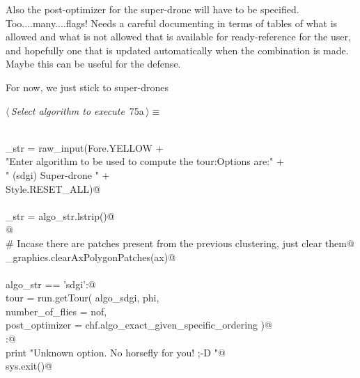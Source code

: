 \documentclass[11.5pt]{report}
\begin{document}
Also the post-optimizer for the super-drone will have to be specified. Too....many....flags! 
Needs a careful documenting in terms of tables of what is allowed and what is not allowed
that is available for ready-reference for the user, and hopefully one that is updated
automatically when the combination is made. Maybe this can be useful for the defense.  

For now, we just stick to super-drones

\begin{flushleft} \small
\begin{minipage}{\linewidth}\label{scrap105}\raggedright\small
{} $\langle\,${\itshape Select algorithm to execute}\nobreak\ {\footnotesize {75a}}$\,\rangle\equiv$
\vspace{-1ex}
\begin{list}{}{} \item
\mbox{}\verb@@\\
\mbox{}\verb@algo_str = raw_input(Fore.YELLOW                                             +\@\\
\mbox{}\verb@        "Enter algorithm to be used to compute the tour:\n Options are:\n"   +\@\\
\mbox{}\verb@        " (sdgi)   Super-drone \n"                                           +\@\\
\mbox{}\verb@        Style.RESET_ALL)@\\
\mbox{}\verb@@\\
\mbox{}\verb@algo_str = algo_str.lstrip()@\\
\mbox{}\verb@ @\\
\mbox{}\verb@# Incase there are patches present from the previous clustering, just clear them@\\
\mbox{}\verb@utils_graphics.clearAxPolygonPatches(ax)@\\
\mbox{}\verb@@\\
\mbox{}\verb@if   algo_str == 'sdgi':@\\
\mbox{}\verb@      tour = run.getTour( algo_sdgi, phi, \@\\
\mbox{}\verb@                          number_of_flies = nof, \@\\
\mbox{}\verb@                          post_optimizer = chf.algo_exact_given_specific_ordering )@\\
\mbox{}\verb@else:@\\
\mbox{}\verb@      print "Unknown option. No horsefly for you! ;-D "@\\
\mbox{}\verb@      sys.exit()@\\

\end{list}
\end{minipage}
\end{flushleft}
\end{document}
